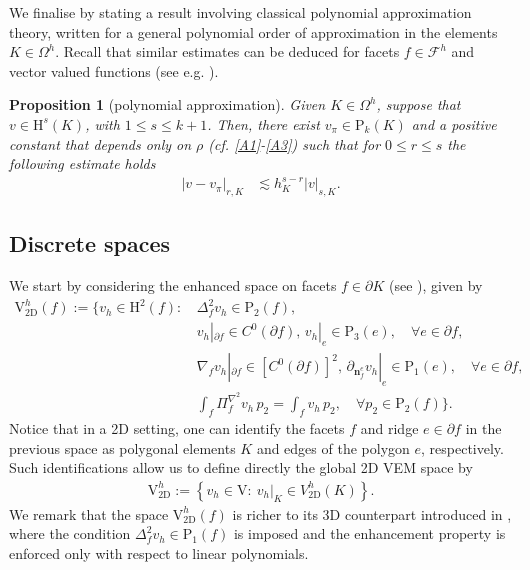 \documentclass[final,reqno]{elsarticle}
\newtheorem{proposition}{Proposition}[section]
\newcommand\rP{\mathrm{P}}
\def\rH{\mathrm{H}}
\def\rP{\mathrm{P}}
\def\rV{\mathrm{V}}
\begin{document}
We finalise by stating a result involving classical polynomial approximation theory, written for a general polynomial order of approximation in the elements $K\in \Omega^h$. Recall that similar estimates can be deduced for facets $f\in \mathcal{F}^h$ and vector valued functions (see e.g. \cite{BS-2008}). 
\begin{proposition}[polynomial approximation] \label{prop:est_poly}
    Given $K\in \Omega^h$, suppose that $v\in  \rH^{s}(K)$, with  $1 \leq s \leq k+1$. Then, there exist $v_\pi \in \rP_k(K)$ and a positive constant that depends only on $\rho$ ({cf.} \ref{A1}-\ref{A3}) such that for $0\leq r\leq s$ the following estimate holds
    \begin{align*}
        |v - v_\pi|_{r,K} &\lesssim  h_K^{s-r}|v|_{{s},K}.
    \end{align*} 
\end{proposition}

\subsection{Discrete spaces}\label{sec:discrete_spaces}
We start by considering the enhanced space on facets $f\in \partial K$ (see \cite{ABSV2016}), given by
\begin{align*}
    \rV^h_{2\mathrm{D}}(f):=\Big\{
    v_h\in \rH^2(f) : \,&\Delta^2_{f}v_h\in\rP_{2}(f), \\
    & v_h|_{\partial f}\in C^0(\partial f),\, v_h|_e\in\rP_3(e),\quad \forall e\in\partial f,\\
    & \nabla_{f} v_h|_{\partial f}\in [C^0(\partial f)]^2,\, \partial_{{\boldsymbol{n}}_f^e} v_h|_e\in\rP_1(e),\quad\forall e\in\partial f, \\
    &\int_f \Pi_{f}^{\nabla^2}v_h \,p_2=\int_f v_h\,p_{2}, \quad \forall p_{2}\in \rP_{2}(f) \Big\}.
\end{align*}
Notice that in a 2D setting, one can identify the facets $f$ and ridge $e\in \partial f$ in the previous space as polygonal elements $K$ and edges of the polygon $e$, respectively. Such identifications allow us to define directly the global 2D VEM space by 
\begin{align*}
    \rV^h_{2\mathrm{D}}  :=\left\{v_h \in  \rV  :\ v_h|_K\in  V^h_{2\mathrm{D}}(K)\right\}.%
\end{align*}
We remark that the space $\rV^h_{2\mathrm{D}}(f)$ is richer to its 3D counterpart introduced in \cite{BDR2019C1Polyhedral}, where the condition $\Delta_f^2 v_h \in \rP_1(f)$ is imposed and the enhancement property is enforced only with respect to linear polynomials.
\end{document}
